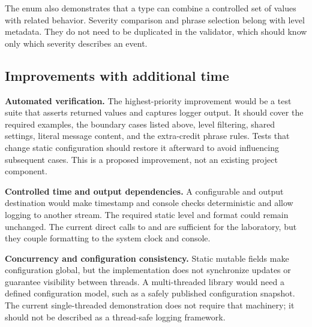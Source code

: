 The enum also demonstrates that a type can combine a controlled set of values with related behavior. Severity comparison and phrase selection belong with level metadata. They do not need to be duplicated in the validator, which should know only which severity describes an event.

\subsection{Improvements with additional time}
\textbf{Automated verification.} The highest-priority improvement would be a test suite that asserts returned values and captures logger output. It should cover the required examples, the boundary cases listed above, level filtering, shared settings, literal message content, and the extra-credit phrase rules. Tests that change static configuration should restore it afterward to avoid influencing subsequent cases. This is a proposed improvement, not an existing project component.

\textbf{Controlled time and output dependencies.} A configurable  and output destination would make timestamp and console checks deterministic and allow logging to another stream. The required static level and format could remain unchanged. The current direct calls to  and  are sufficient for the laboratory, but they couple formatting to the system clock and console.

\textbf{Concurrency and configuration consistency.} Static mutable fields make configuration global, but the implementation does not synchronize updates or guarantee visibility between threads. A multi-threaded library would need a defined configuration model, such as a safely published configuration snapshot. The current single-threaded demonstration does not require that machinery; it should not be described as a thread-safe logging framework.

